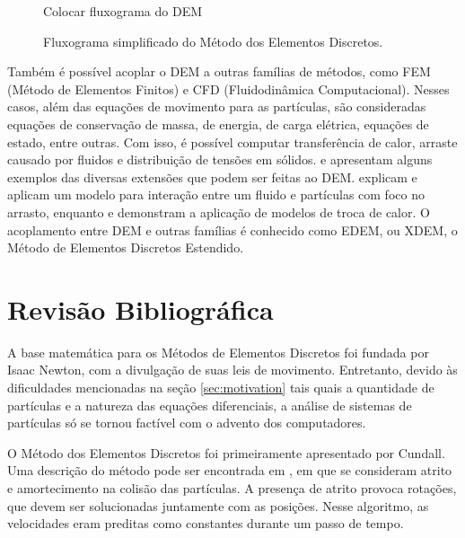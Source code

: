 \begin{figure}[h]
	\caption{Fluxograma simplificado do Método dos Elementos Discretos.}
	\begin{center}
		\alert{Colocar fluxograma do DEM}
	\end{center}
	\label{fig:simple_dem_algorithm}
\end{figure}

Também é possível acoplar o DEM a outras famílias de métodos, como FEM (Método de Elementos Finitos) e CFD (Fluidodinâmica Computacional). Nesses casos, além das equações de movimento para as partículas, são consideradas equações de conservação de massa, de energia, de carga elétrica, equações de estado, entre outras. Com isso, é possível computar transferência de calor, arraste causado por fluidos e distribuição de tensões em sólidos.  e  apresentam alguns exemplos das diversas extensões que podem ser feitas ao DEM.  explicam e aplicam um modelo para interação entre um fluido e partículas com foco no arrasto, enquanto  e  demonstram a aplicação de modelos de troca de calor. O acoplamento entre DEM e outras famílias é conhecido como EDEM, ou XDEM, o Método de Elementos Discretos Estendido.

\section{Revisão Bibliográfica}

A base matemática para os Métodos de Elementos Discretos foi fundada por Isaac Newton, com a divulgação de suas leis de movimento. Entretanto, devido às dificuldades mencionadas na seção \ref{sec:motivation} tais quais a quantidade de partículas e a natureza das equações diferenciais, a análise de sistemas de partículas só se tornou factível com o advento dos computadores.

O Método dos Elementos Discretos foi primeiramente apresentado por Cundall. Uma descrição do método pode ser encontrada em , em que se consideram atrito e amortecimento na colisão das partículas. A presença de atrito provoca rotações, que devem ser solucionadas juntamente com as posições. Nesse algoritmo, as velocidades eram preditas como constantes durante um passo de tempo.

